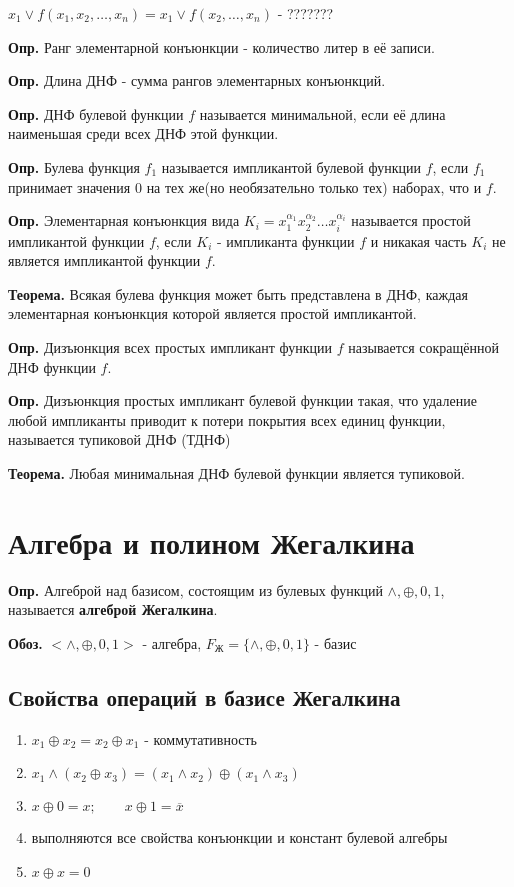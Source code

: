 \documentclass[10pt]{article}
\begin{document}
\par $x_1 \lor f(x_1, x_2, \dots, x_n) = x_1 \lor f(x_2, \dots, x_n)$ - ???????

\par \textbf{Опр.} Ранг элементарной конъюнкции - количество литер в её записи.
\par \textbf{Опр.} Длина ДНФ - сумма рангов элементарных конъюнкций.
\par \textbf{Опр.} ДНФ булевой функции $f$ называется минимальной, если её длина наименьшая среди всех ДНФ этой функции.
\par \textbf{Опр.} Булева функция $f_1$ называется импликантой булевой функции $f$, если $f_1$ принимает значения $0$ на тех же(но необязательно только тех) наборах, что и $f$.
\par \textbf{Опр.} Элементарная конъюнкция вида $K_i = x_1^{\alpha_1} x_2^{\alpha_2} \dots x_i^{\alpha_i}$ называется простой импликантой функции $f$, если $K_i$ - импликанта функции $f$ и никакая часть $K_i$ не является импликантой функции $f$.
\par \textbf{Теорема.} Всякая булева функция может быть представлена в ДНФ, каждая элементарная конъюнкция которой является простой импликантой.
\par \textbf{Опр.} Дизъюнкция всех простых импликант функции $f$ называется сокращённой ДНФ функции $f$.
\par \textbf{Опр.} Дизъюнкция простых импликант булевой функции такая, что удаление любой импликанты приводит к потери покрытия всех единиц функции, называется тупиковой ДНФ (ТДНФ)
\par \textbf{Теорема.} Любая минимальная ДНФ булевой функции является тупиковой.

\section*{Алгебра и полином Жегалкина}
\par\textbf{Опр.} Алгеброй над базисом, состоящим из булевых функций $\land, \oplus, 0, 1$, называется \textbf{алгеброй Жегалкина}.
\par\textbf{Обоз.} $<\land, \oplus, 0, 1>$ - алгебра, $F_\text{Ж} = \{ \land, \oplus, 0, 1 \}$ - базис
\subsection*{Свойства операций в базисе Жегалкина}
\begin{enumerate}
    \item $x_1 \oplus x_2 = x_2 \oplus x_1$ - коммутативность
    \item $x_1 \land (x_2 \oplus x_3) = (x_1 \land x_2) \oplus (x_1 \land x_3)$
    \item $x \oplus 0 = x; \qquad x \oplus 1 = \overline x$
    \item выполняются все свойства конъюнкции и констант булевой алгебры
    \item $x \oplus x = 0$
\end{enumerate}
\end{document}
